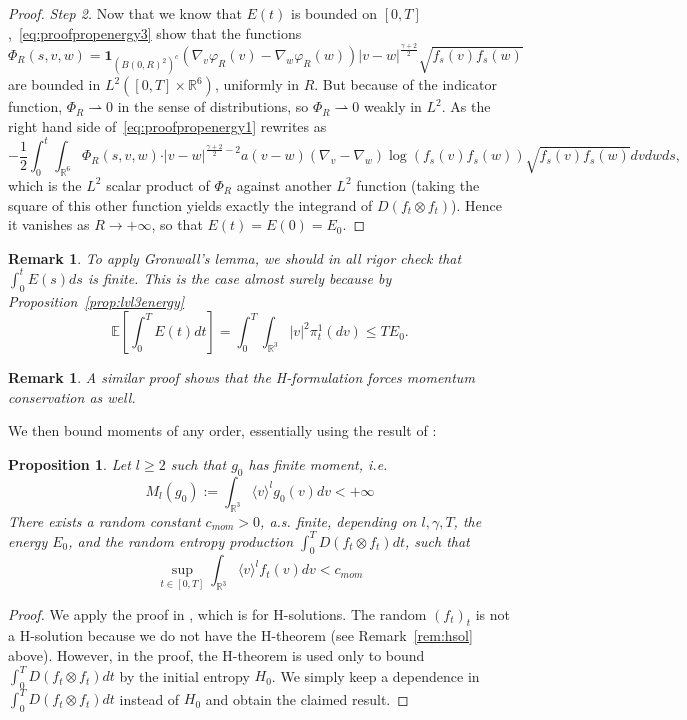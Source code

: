 \documentclass[11pt,a4paper]{article}
\theoremstyle{definition}
\theoremstyle{plain}
\newtheorem{prop}[defi]{Proposition}
\newtheorem{remark}[defi]{Remark}
\newcommand{\jap}[1]{\langle #1 \rangle}
\begin{document}
\begin{proof}
    \textit{Step 2.} Now that we know that $E(t)$ is bounded on $[0,T]$,~\eqref{eq:proofpropenergy3} show that the functions
    $$\Phi_R(s,v,w)=\mathbf{1}_{(B(0,R)^2)^c}( \nabla_v\varphi_R(v) - \nabla_w\varphi_R(w)) \vert v-w\vert^{\frac{\gamma+2}{2}} \sqrt{f_s(v) f_s(w)}$$
    are bounded in $L^2([0,T]\times\mathbb{R}^6)$, uniformly in $R$. But because of the indicator function, $\Phi_R \rightharpoonup 0$ in the sense of distributions, so $\Phi_R\rightharpoonup 0$ weakly in $L^2$.
    As the right hand side of~\eqref{eq:proofpropenergy1} rewrites as
    $$-\frac{1}{2}\int_0^t \int_{\mathbb{R}^6} \Phi_R(s,v,w)
     \cdot \vert v-w\vert^{\frac{\gamma+2}{2}-2} a(v-w) (\nabla_v - \nabla_w)\log(f_s(v)f_s(w)) \sqrt{f_s(v) f_s(w)}dvdwds,$$
    which is the $L^2$ scalar product of $\Phi_R$ against another $L^2$ function (taking the square of this other function yields exactly the integrand of $D(f_t\otimes f_t)$). Hence it vanishes as $R\rightarrow+\infty$, so that $E(t)=E(0)=E_0$.
\end{proof}
\begin{remark}
    To apply Gronwall's lemma, we should in all rigor check that $\int_0^t E(s)ds$ is finite. This is the case almost surely because by Proposition~\ref{prop:lvl3energy} $$\mathbb{E}\left[\int_0^T E(t)dt\right]=\int_0^T\int_{\mathbb{R}^3} \vert v \vert^2 \pi^1_t(dv)\leq T E_0.$$
\end{remark}
\begin{remark}
    A similar proof shows that the H-formulation forces momentum conservation as well.
\end{remark}
We then bound moments of any order, essentially using the result of \cite{CarrapatosoDesvillettesHe2015}:
\begin{prop}\cite[adapted from Lemma 8]{CarrapatosoDesvillettesHe2015}
    \label{prop:propofmoments}
    Let $l\geq 2$ such that $g_0$ has finite moment, \textit{i.e.}
    $$M_l(g_0):=\int_{\mathbb{R}^3} \jap{v}^{l}g_0(v)dv<+\infty$$
    There exists a \textit{random} constant $c_{mom}>0$, a.s. finite, depending on $l,\gamma,T$, the energy $E_0$, and the random entropy production $\int_0^T D(f_t\otimes f_t)dt$, such that
    $$\sup_{t\in[0,T]}\int_{\mathbb{R}^3} \jap{v}^{l}f_t(v)dv < c_{mom}$$
\end{prop}
\begin{proof}
    We apply the proof in \cite[Lemma 8]{CarrapatosoDesvillettesHe2015}, which is for H-solutions. The random $(f_t)_t$ is not a H-solution because we do not have the H-theorem (see Remark~\ref{rem:hsol} above). However, in the proof, the H-theorem is used only to bound $\int_0^T D(f_t\otimes f_t)dt$ by the initial entropy $H_0$. We simply keep a dependence in $\int_0^T D(f_t\otimes f_t)dt$ instead of $H_0$ and obtain the claimed result.
\end{proof}
\end{document}
